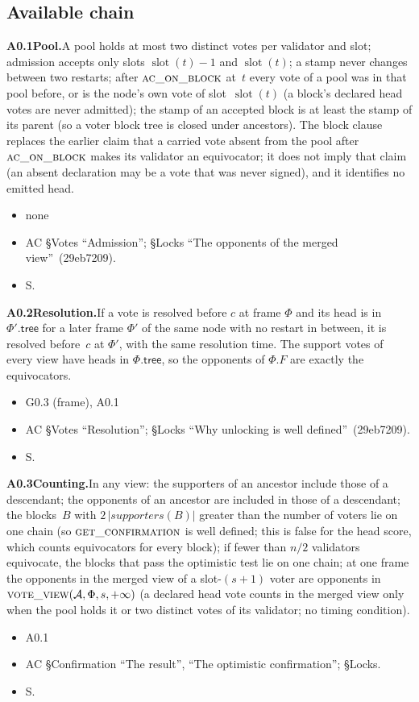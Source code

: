 \documentclass{article}
\newcommand{\slot}{\operatorname{slot}}
\newcommand{\AC}{\mathcal A}
\newcommand{\Fr}{\Phi}
\newcommand{\fname}[1]{\text{\textsc{#1}}}
\newcommand{\dagnode}[6]{%
\par\medskip\noindent\textbf{#1\enspace #2.}\enspace #3
\begin{itemize}[leftmargin=2.2em,itemsep=0pt,topsep=2pt]
\item[\emph{Uses}] #4
\item[\emph{Evid.}] #5
\item[\emph{Task}] #6
\end{itemize}}
\begin{document}
\subsection{Available chain}

\dagnode{A0.1}{Pool}{A pool holds at most two distinct votes per validator
and slot; admission accepts only slots $\slot(t)-1$ and $\slot(t)$; a stamp
never changes between two restarts; after $\fname{ac\_on\_block}$ at~$t$
every vote of a pool was in that pool before, or is the node's own vote of
slot~$\slot(t)$ (a block's declared head votes are never admitted);
the stamp of an accepted block is at least the stamp of its parent (so a voter
block tree is closed under ancestors).  The block clause replaces the
earlier claim that a carried vote absent from the pool after
$\fname{ac\_on\_block}$ makes its validator an equivocator; it does not
imply that claim (an absent declaration may be a vote that was never signed),
and it identifies no emitted head.}
{none}{AC \S Votes ``Admission''; \S Locks ``The opponents of the merged view''~(29eb7209).}{S.}

\dagnode{A0.2}{Resolution}{If a vote is resolved before $c$ at frame $\Fr$ and
its head is in $\Fr'.\mathsf{tree}$ for a later frame $\Fr'$ of the same node
with no restart in between, it is resolved before~$c$ at $\Fr'$, with the same
resolution time.  The support votes of every view have heads in
$\Fr.\mathsf{tree}$, so the opponents of $\Fr.F$ are exactly the
equivocators.}
{G0.3 (frame), A0.1}{AC \S Votes ``Resolution''; \S Locks ``Why unlocking is well defined''~(29eb7209).}{S.}

\dagnode{A0.3}{Counting}{In any view: the supporters of an ancestor include
those of a descendant; the opponents of an ancestor are included in those of
a descendant; the blocks~$B$ with $2\,|\mathit{supporters}(B)|$ greater than
the number of voters lie on one chain (so $\fname{get\_confirmation}$ is well
defined; this is false for the head score, which counts equivocators for
every block); if fewer than $n/2$
validators equivocate, the blocks that pass the optimistic test lie on one
chain; at one frame the opponents in the merged view of a slot-$(s+1)$ voter
are opponents in $\fname{vote\_view}(\AC,\Fr,s,+\infty)$ (a declared head
vote counts in the merged view only when the pool holds it or two distinct
votes of its validator; no timing condition).}
{A0.1}{AC \S Confirmation ``The result'', ``The optimistic confirmation'';
\S Locks.}{S.}
\end{document}

